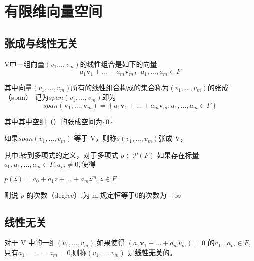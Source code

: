 \section{有限维向量空间}
\subsection{张成与线性无关}
\begin{definition}
    V中一组向量$(v_{1}...,v_{m})$的线性组合是如下的向量
    \begin{equation}
     a_{1}\textbf{v}_{1}+...+a_{m}\textbf{v}_{m}，a_{1},...,a_{m}\in F   
    \end{equation}
\end{definition}
其中$向量(v_{1},...,v_{m})$所有的线性组合构成的集合称为$(v_{1},...,v_{m})$的张成（span）
记为$span(v_{1},...,v_{m})$即为
\begin{equation}
    span(\textbf{v}_{1},...,\textbf{v}_{m})=\left\{ a_{1}\textbf{v}_{1}+...+a_{m}\textbf{v}_{m}:a_{1},...,a_{m}\in  F\right\}
\end{equation}
\par 其中其中空组（）的张成空间为\{0\} 
\begin{definition}
    如果$span(v_{1},...,v_{m})$ 等于 V，则称$s(v_{1},...,v_{m})$张成 V，
\end{definition}
其中:转到多项式的定义，对于多项式 $p\in\mathcal{P}(F)$ 如果存在标量 $a_{0},a_{1},...,a_{m}\in F,a_{m}\neq 0,使得$
\begin{center}    
$p(z)=a_{0}+a_{1}z+...+a_{m}z^m,z\in F$
\end{center}
\par 则说 $p$ 的次数（degree）,为 m.规定恒等于0的次数为 $-\infty$
\subsection*{线性无关}
\begin{definition}
    对于 V 中的一组$(v_{1},...,v_{m})$,如果使得 $(a_{1}\textbf{v}_{1}+...+a_{m}v_{m})=0$ 
的$a_{1}...a_{m}\in F$,只有$a_{1}=...=a_{m}= 0$,则称$(v_{1},...,v_{m})$ 
是{\bfseries 线性无关}的。
\end{definition}
